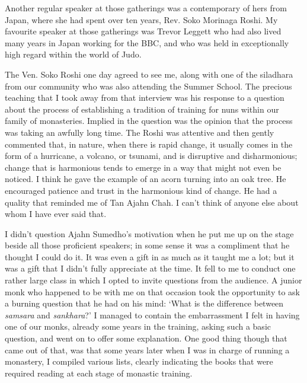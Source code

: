 Another regular speaker at those gatherings was a contemporary of hers
from Japan, where she had spent over ten years, Rev. Soko Morinaga Roshi\cite{soko}.
My favourite speaker at those gatherings was Trevor Leggett\cite{leggett}
who had also lived many years in Japan working for
the BBC, and who was held in exceptionally high regard within the world
of Judo.

The Ven. Soko Roshi one day agreed to see me, along with one of the
siladhara from our community who was also attending the Summer School.
The precious teaching that I took away from that interview was his
response to a question about the process of establishing a tradition of
training for nuns within our family of monasteries. Implied in the
\mbox{question} was the opinion that the process was taking an awfully long
time. The Roshi was attentive and then gently commented that, in nature,
when there is rapid change, it usually comes in the form of a hurricane,
a volcano, or tsunami, and is disruptive and disharmonious; change that
is harmonious tends to emerge in a way that might not even be noticed. I
think he gave the example of an acorn turning into an oak tree. He
encouraged patience and trust in the harmonious kind of change. He had a
quality that reminded me of Tan Ajahn Chah. I can't think of anyone else
about whom I have ever said that.

I didn't question Ajahn Sumedho's motivation when he put me up on the
stage beside all those proficient speakers; in some sense it was a
compliment that he thought I could do it. It was even a gift in as much
as it taught me a lot; but it was a gift that I didn't fully appreciate
at the time. It fell to me to conduct one rather large class in which I
opted to invite questions from the audience. A junior monk who happened
to be with me on that occasion took the opportunity to ask a burning
question that he had on his mind: `What is the difference between
\emph{samsara} and \emph{sankhara}?' I managed to contain the
embarrassment I felt in having one of our monks, already some years in
the training, asking such a basic question, and went on to offer some
explanation. One good thing though that came out of that, was that some
years later when I was in charge of running a monastery, I compiled
various lists, clearly indicating the books that were required reading
at each stage of monastic training.

